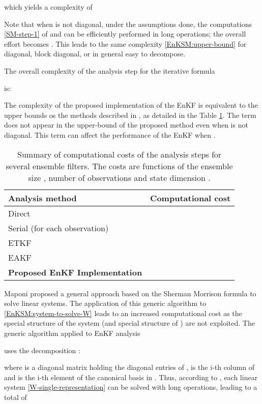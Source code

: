 \documentclass[12pt]{article}
\begin{document}
which yields a complexity of

Note that when  is not diagonal, under the assumptions done, the computations  \eqref{SM-step-1} of  and  can be efficiently performed in  long operations;  the overall effort becomes . This leads to the same complexity  \eqref{EnKSM:upper-bound} for  diagonal, block diagonal, or in general easy to decompose. 

The overall complexity of the analysis step for the iterative formula

is:

The complexity of the proposed implementation of the EnKF is equivalent to the upper bounds os the methods described in \cite{Tippett2003}, as detailed in the Table  \ref{Tab:Analysis-Complexity-Contrast}. The term  does not appear in the upper-bound of the proposed method even when  is not diagonal. This term can affect the performance of the EnKF when .

\begin{table}[H]
\centering
\begin{tabular}{|l|l|} \hline
\bf Analysis method & \bf Computational cost \\ \hline
Direct \cite{Tippett2003} &  \\
Serial \cite{Anderson07} (for each observation) &  \\
ETKF \cite{Anderson01} &  \\
EAKF \cite{Anderson01} &  \\
{\bf Proposed EnKF Implementation} &  \\ \hline
\end{tabular}
\caption{Summary of computational costs of the analysis steps for several ensemble filters. The costs are functions of the ensemble size , number of observations  and state dimension .}
\label{Tab:Analysis-Complexity-Contrast}
\end{table}

Maponi \cite{Maponi2007276} proposed a general approach based on the Sherman Morrison formula  to solve linear systems. The application of this generic algorithm 
to \eqref{EnKSM:system-to-solve-W} leads to an increased computational cost as the special structure of the system (and special structure of ) are not exploited. The generic algorithm 
applied to EnKF analysis 

uses the decomposition \cite[Remark 1]{Maponi2007276}:

where  is a diagonal matrix holding the diagonal entries of ,  is the i-th column of  and  is the i-th element of the canonical basis in . Thus, according to \cite[Corollary 4]{Maponi2007276}, each linear system \eqref{W-single-representation} can be solved with  long operations, leading to a total of
\end{document}
